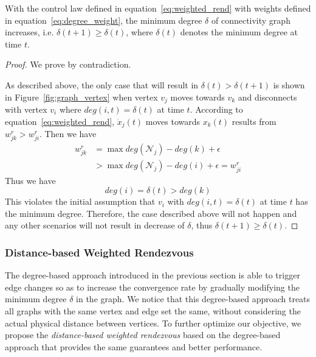 \documentclass[../main.tex]{subfiles}
\begin{document}
\begin{preposition} \label{thm:delta_increase}
With the control law defined in equation~\ref{eq:weighted_rend} with weights defined in equation~\ref{eq:degree_weight}, the minimum degree $\delta$ of connectivity graph increases, i.e. $\delta(t+1) \geq \delta(t)$, where $\delta(t)$ denotes the minimum degree at time $t$. 
\end{preposition}
\begin{proof}
We prove by contradiction.

As described above, the only case that will result in $\delta(t) > \delta(t+1)$ is shown in Figure~\ref{fig:graph_vertex} when vertex $v_j$ moves towards $v_k$ and disconnects with vertex $v_i$ where $deg(i, t) = \delta(t)$ at time $t$. According to equation~\ref{eq:weighted_rend}, $\dot x_j(t)$ moves towards $x_k(t)$ results from $w_{jk}^r > w_{ji}^r$. Then we have
{\small \begin{align*}
w_{jk}^r &= \max deg(\mathcal{N}_j) - deg(k) + \epsilon \\
&> \max deg(\mathcal{N}_j) - deg(i) + \epsilon = w_{ji}^r
\end{align*}}
Thus we have
\begin{equation} 
    deg(i) = \delta(t) > deg(k)
\end{equation}
This violates the initial assumption that $v_i$ with $deg(i, t) = \delta(t)$ at time $t$ has the minimum degree. Therefore, the case described above will not happen and any other scenarios will not result in decrease of $\delta$, thus $\delta(t+1) \geq \delta(t)$.
\end{proof}

\subsubsection{Distance-based Weighted Rendezvous}
The degree-based approach introduced in the previous section is able to trigger edge changes so as to increase the convergence rate by gradually modifying the minimum degree $\delta$ in the graph. We notice that this degree-based approach treats all graphs with the same vertex and edge set the same, without considering the actual physical distance between vertices. To further optimize our objective, we propose the \textit{distance-based weighted rendezvous} based on the degree-based approach that provides the same guarantees and better performance.
\end{document}
